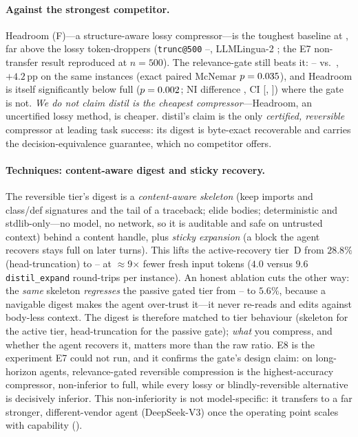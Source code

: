 \documentclass{article}
\newcommand{\sweEeightN}{500}\newcommand{\sweEeightSeed}{1729}%
\newcommand{\sweEeightDistilPass}{--}\newcommand{\sweEeightDistilResolved}{--}%
\newcommand{\sweEeightExpandPass}{--}\newcommand{\sweEeightExpandResolved}{--}%
\newcommand{\sweEeightGatedPass}{--}\newcommand{\sweEeightGatedResolved}{--}%
\begin{document}
\paragraph{Against the strongest competitor.} Headroom (F)---a structure-aware lossy
compressor---is the toughest baseline at \sweEeightHeadroomPass{}, far above the lossy
token-droppers (\texttt{trunc@500} \sweEeightDistilPass{}, LLMLingua-2 \sweEeightLinguaPass{};
the E7 non-transfer result reproduced at $n=\sweEeightN{}$). The relevance-gate still beats
it: \sweEeightGatedPass{} vs.\ \sweEeightHeadroomPass{}, $+4.2$\,pp on the same instances
(exact paired McNemar $p=0.035{}$), and Headroom is itself significantly
below full ($p=0.002{}$; NI difference \sweEeightHeadroomNIDelta{}, CI
[\sweEeightHeadroomNICIlo, \sweEeightHeadroomNICIhi]) where the gate is not. \emph{We do not
claim distil is the cheapest compressor}---Headroom, an uncertified lossy method, is cheaper.
distil's claim is the only \emph{certified, reversible} compressor at leading task success:
its digest is byte-exact recoverable and carries the decision-equivalence guarantee, which
no competitor offers.

\paragraph{Techniques: content-aware digest and sticky recovery.} The reversible tier's
digest is a \emph{content-aware skeleton} (keep imports and class/def signatures and the
tail of a traceback; elide bodies; deterministic and stdlib-only---no model, no network, so
it is auditable and safe on untrusted context) behind a content handle, plus \emph{sticky
expansion} (a block the agent recovers stays full on later turns). This lifts the
active-recovery tier~D from $28.8\%$ (head-truncation) to \sweEeightExpandPass{} at
$\approx$9$\times$ fewer fresh input tokens ($4.0$ versus $9.6$ \texttt{distil\_expand}
round-trips per instance). An honest ablation cuts the other way: the \emph{same} skeleton
\emph{regresses} the passive gated tier from \sweEeightGatedPass{} to $5.6\%$, because a
navigable digest makes the agent over-trust it---it never re-reads and edits against
body-less context. The digest is therefore matched to tier behaviour (skeleton for the
active tier, head-truncation for the passive gate); \emph{what} you compress, and whether the
agent recovers it, matters more than the raw ratio. E8 is the experiment E7 could not run,
and it confirms the gate's design claim: on long-horizon agents, relevance-gated reversible
compression is the highest-accuracy compressor, non-inferior to full, while every lossy or
blindly-reversible alternative is decisively inferior. This non-inferiority is not
model-specific: it transfers to a far stronger, different-vendor agent (DeepSeek-V3) once the
operating point scales with capability ().
\end{document}

